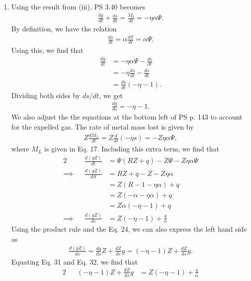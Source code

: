 \documentclass[11pt,letterpaper]{article}
\begin{document}
\begin{enumerate}[label=(\roman*)]
\item Using the result from (iii), PS 3.40 becomes
    \begin{align}
        \frac{dg}{dt} + \frac{ds}{dt} = \frac{M_b}{dt} = -\eta\alpha\Psi.
    \end{align}
    By definition, we have the relation 
    \begin{align}
        \frac{ds}{dt} = \alpha \frac{dS}{dt} = \alpha\Psi.
    \end{align}
    Using this, we find that 
    \begin{align}
        \frac{dg}{dt} &= -\eta\alpha\Psi - \frac{ds}{dt} \\
        &= -\eta\frac{ds}{dt} - \frac{ds}{dt} \\
        &= \frac{ds}{dt}(-\eta-1).
    \end{align}
    Dividing both sides by $ds/dt$, we get 
    \begin{align}
        \frac{dg}{ds} = -\eta-1.
    \end{align}
    We also adjust the the equations at the bottom left of PS p. 143 to account for the expelled gas. The rate of metal mass lost is given by 
    \begin{align}
        Z\frac{dM_L}{dt} = Z\frac{d}{dt}(-\eta s) = -Z\eta\alpha\Psi,
    \end{align}
    where $M_L$ is given in Eq. 17. Including this extra term, we find that 
    \begin{alignat}{2}
        &&\frac{d(gZ)}{dt} &= \Psi(RZ+q) - Z\Psi - Z\eta\alpha\Psi \\
        \implies&&\frac{d(gZ)}{dS} &= RZ+q-Z-Z\eta\alpha \\
        &&&= Z(R-1-\eta\alpha) + q \\
        &&&= Z(-\alpha-\eta\alpha) + q \\
        &&&= Z\alpha(-\eta-1) + q \\
        \implies&&\frac{d(gZ)}{ds} &= Z(-\eta-1) + \frac{q}{\alpha}
    \end{alignat}
    Using the product rule and the Eq. 24, we can also express the left hand side as 
    \begin{align}
        \frac{d(gZ)}{ds} = \frac{dg}{ds}Z + \frac{dZ}{ds}g = (-\eta-1)Z + \frac{dZ}{ds}g.
    \end{align}
    Equating Eq. 31 and Eq. 32, we find that 
    \begin{alignat}{2}
        &&(-\eta-1)Z + \frac{dZ}{ds}g &= Z(-\eta-1) + \frac{q}{\alpha} \\

\end{alignat}
\end{enumerate}
\end{document}
